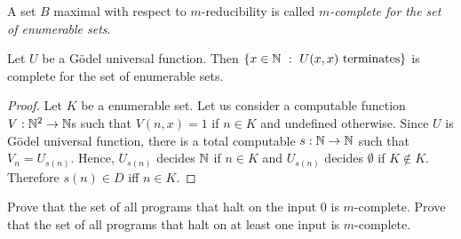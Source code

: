 \begin{definition}
  A set $B$ maximal with respect to $m$-reducibility is called
  \emph{$m$-complete for the set of enumerable sets}.
\end{definition}

\begin{theorem}
  Let $U$ be a G\"odel universal function. 
  Then $\set[U(x, x) \text{ terminates}]{x \in \N}$ is complete for the set of
  enumerable sets.
\end{theorem}
\begin{proof}
  Let $K$ be a enumerable set. Let us consider a computable function $V : {\mathbb{N}}^2
  \to {\mathbb{N}}$s such that $V(n, x) = 1$ if $n \in K$ and undefined otherwise.
  Since $U$ is G\"odel universal function, there is a total computable $s : {\mathbb{N}}
  \to {\mathbb{N}}$ such that $V_n = U_{s(n)}$. Hence,  $U_{s(n)}$ decides ${\mathbb{N}}$ if 
  $n \in K$ and $U_{s(n)}$ decides $\emptyset$ if $K \not\in K$. 
  Therefore $s(n) \in D$ iff $n \in K$.
\end{proof}

\begin{chapterendexercises}
  \exercise Prove that the set of all programs that halt on the input $0$ is
    $m$-complete. Prove that the set of all programs that halt on at least one
    input is $m$-complete.
\end{chapterendexercises}
